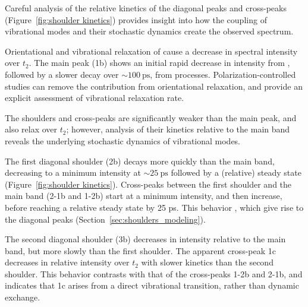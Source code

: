 \documentclass[%
  class = book,%
  crop = false,%
  float = true,%
  multi = true,%
  preview = false,%
]{standalone}
\let\cite\autocite
\begin{document}
{Careful analysis of the relative kinetics of the diagonal peaks and cross-peaks (Figure~\ref{fig:shoulder kinetics}) provides insight into how the coupling of  vibrational modes and their stochastic dynamics create the observed spectrum.

Orientational and vibrational relaxation of  cause a decrease in spectral intensity over \(t_2\). The main peak (1b) shows an initial rapid decrease in intensity from , followed by a slower decay over \(\sim \SI{100}{\ps}\), from  processes. Polarization-controlled studies can remove the contribution from orientational relaxation, and provide an explicit assessment of vibrational relaxation rate.\cite{hamm_concepts_2011,Hochstrasser2001}

The shoulders and cross-peaks are significantly weaker than the main peak, and also relax over \(t_2\); however, analysis of their kinetics relative to the main band reveals the underlying stochastic dynamics of  vibrational modes.

The first diagonal shoulder (2b) decays more quickly than the main band, decreasing to a minimum intensity at \(\sim \SI{25}{\ps}\) followed by a (relative) steady state (Figure~\ref{fig:shoulder kinetics}). Cross-peaks between the first shoulder and the main band (2-1b and 1-2b) start at a minimum intensity, and then increase, before reaching a relative steady state by 25 ps. This behavior , which give rise to the diagonal peaks (Section~\ref{sec:shoulders_modeling}).

The second diagonal shoulder (3b) decreases in intensity relative to the main band, but more slowly than the first shoulder. The apparent cross-peak 1c decreases in relative intensity over \(t_2\) with slower kinetics than the second shoulder. This behavior contrasts with that of the cross-peaks 1-2b and 2-1b, and indicates that 1c arises from a direct vibrational transition, rather than dynamic exchange.

}
\end{document}
